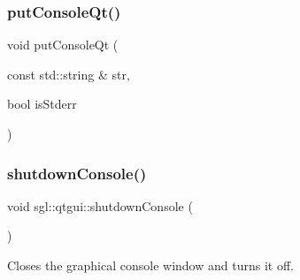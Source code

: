 \subsubsection{\texorpdfstring{put\+Console\+Qt()}{putConsoleQt()}}
{\footnotesize\ttfamily void put\+Console\+Qt (\begin{DoxyParamCaption}\item[{const std\+::string \&}]{str,  }\item[{bool}]{is\+Stderr }\end{DoxyParamCaption})}

\mbox{\label{namespacesgl_1_1qtgui_a17eaeea713c89cc6d22caf36237b1955}} 
\subsubsection{\texorpdfstring{shutdown\+Console()}{shutdownConsole()}}
{\footnotesize\ttfamily void sgl\+::qtgui\+::shutdown\+Console (\begin{DoxyParamCaption}{ }\end{DoxyParamCaption})}



Closes the graphical console window and turns it off. 

